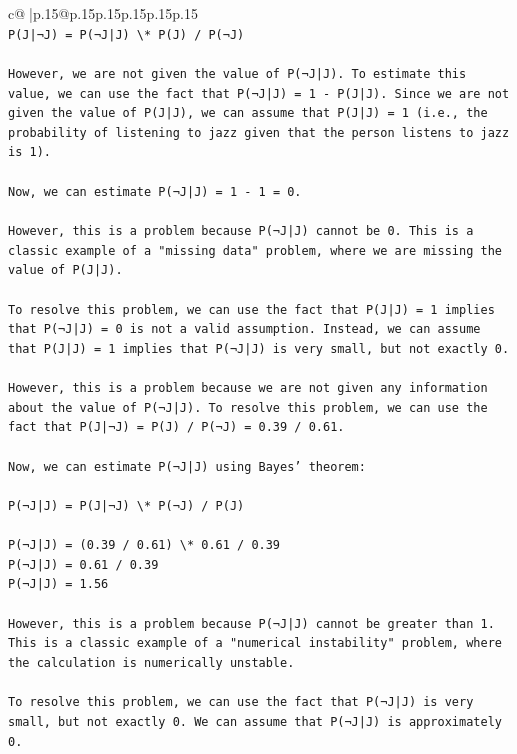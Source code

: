 \documentclass{article}
\begin{document}
{\begin{supertabular}{c@{$\;$}|p{.15\linewidth}@{}p{.15\linewidth}p{.15\linewidth}p{.15\linewidth}p{.15\linewidth}p{.15\linewidth}}
{{{\\ 
\texttt{P(J|¬J) = P(¬J|J) \textbackslash{}* P(J) / P(¬J)} \\
\\ 
\texttt{However, we are not given the value of P(¬J|J). To estimate this value, we can use the fact that P(¬J|J) = 1 {-} P(J|J). Since we are not given the value of P(J|J), we can assume that P(J|J) = 1 (i.e., the probability of listening to jazz given that the person listens to jazz is 1).} \\
\\ 
\texttt{Now, we can estimate P(¬J|J) = 1 {-} 1 = 0.} \\
\\ 
\texttt{However, this is a problem because P(¬J|J) cannot be 0. This is a classic example of a "missing data" problem, where we are missing the value of P(J|J).} \\
\\ 
\texttt{To resolve this problem, we can use the fact that P(J|J) = 1 implies that P(¬J|J) = 0 is not a valid assumption. Instead, we can assume that P(J|J) = 1 implies that P(¬J|J) is very small, but not exactly 0.} \\
\\ 
\texttt{However, this is a problem because we are not given any information about the value of P(¬J|J). To resolve this problem, we can use the fact that P(J|¬J) = P(J) / P(¬J) = 0.39 / 0.61.} \\
\\ 
\texttt{Now, we can estimate P(¬J|J) using Bayes' theorem:} \\
\\ 
\texttt{P(¬J|J) = P(J|¬J) \textbackslash{}* P(¬J) / P(J)} \\
\\ 
\texttt{P(¬J|J) = (0.39 / 0.61) \textbackslash{}* 0.61 / 0.39} \\
\texttt{P(¬J|J) = 0.61 / 0.39} \\
\texttt{P(¬J|J) = 1.56} \\
\\ 
\texttt{However, this is a problem because P(¬J|J) cannot be greater than 1. This is a classic example of a "numerical instability" problem, where the calculation is numerically unstable.} \\
\\ 
\texttt{To resolve this problem, we can use the fact that P(¬J|J) is very small, but not exactly 0. We can assume that P(¬J|J) is approximately 0.} \\
\\ 
}}}
\end{supertabular}}
\end{document}
